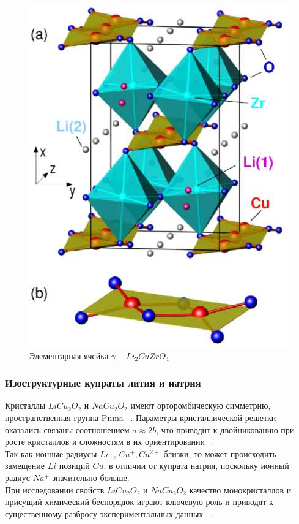 \documentclass[11pt]{article}
\begin{document}
\begin{figure}[htp]
\centering
\includegraphics[scale=0.55]{Li2ZrCuO4}
\caption {Элементарная ячейка $\gamma - Li_2CuZrO_4$ ~\cite{schmitt2009}}
\label{}
\end{figure}



\subsubsection{Изоструктурные купраты лития и натрия}
Кристаллы $LiCu_2O_2$ и $NaCu_2O_2$ имеют орторомбическую симметрию, пространственная группа Pnma ~\cite{tams}. Параметры кристаллической решетки оказались связаны соотношением $a \approx 2b$, что приводит к двойникованию при росте кристаллов и сложностям в их ориентировании ~\cite{maljuk2004}. \\

Так как ионные радиусы $Li^+$, $Cu^{+}, Cu^{2+}$ близки, то может происходить замещение $Li$ позиций $Cu$, в отличии от купрата натрия, поскольку ионный радиус $Na^{+}$ значительно больше. \\

При исследовании свойств $LiCu_2O_2$ и $NaCu_2O_2$ качество монокристаллов и присущий химический беспорядок играют ключевую роль и приводят к существенному разбросу экспериментальных данных ~\cite{nm}. \\
\end{document}
